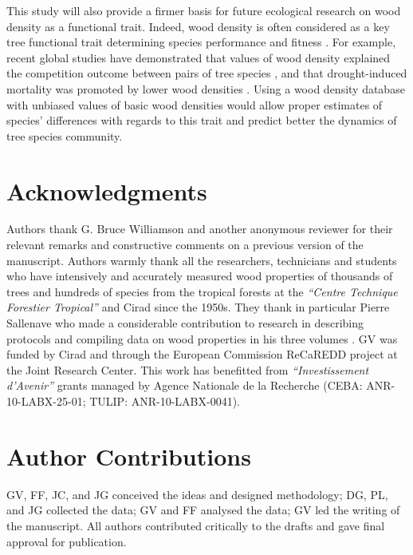 \documentclass[a4paper, 12pt, leqno, dvipsnames]{article}\usepackage[]{graphicx}\usepackage[]{color}
\begin{document}
This study will also provide a firmer basis for future ecological research on wood density as a functional trait. Indeed, wood density is often considered as a key tree functional trait determining species performance and fitness \citep{Chave2009, Baraloto2010, Kunstler2016, Diaz2016, Greenwood2017}. For example, recent global studies have demonstrated that values of wood density explained the competition outcome between pairs of tree species \citep{Kunstler2016}, and that drought-induced mortality was promoted by lower wood densities \citep{Greenwood2017}. Using a wood density database with unbiased values of basic wood densities would allow proper estimates of species' differences with regards to this trait and predict better the dynamics of tree species community.

\newpage

\section*{Acknowledgments}

Authors thank G. Bruce Williamson and another anonymous reviewer for their relevant remarks and constructive comments on a previous version of the manuscript. Authors warmly thank all the researchers, technicians and students who have intensively and accurately measured wood properties of thousands of trees and hundreds of species from the tropical forests at the \emph{``Centre Technique Forestier Tropical''} and Cirad since the 1950s. They thank in particular Pierre Sallenave who made a considerable contribution to research in describing protocols and compiling data on wood properties in his three volumes \citep{Sallenave1955, Sallenave1964, Sallenave1971}. GV was funded by Cirad and through the European Commission ReCaREDD project at the Joint Research Center. This work has benefitted from \emph{``Investissement d'Avenir''} grants managed by Agence Nationale de la Recherche (CEBA: ANR-10-LABX-25-01; TULIP: ANR-10-LABX-0041).

\section*{Author Contributions}

GV, FF, JC, and JG conceived the ideas and designed methodology; DG, PL, and JG collected the data; GV and FF analysed the data; GV led the writing of the manuscript. All authors contributed critically to the drafts and gave final approval for publication.
\end{document}
